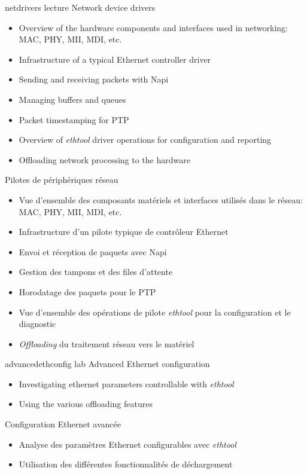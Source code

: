 {netdrivers}
{lecture}
{Network device drivers}
{
  \begin{itemize}
  \item Overview of the hardware components and interfaces used in
    networking: MAC, PHY, MII, MDI, etc.
  \item Infrastructure of a typical Ethernet controller driver
  \item Sending and receiving packets with Napi
  \item Managing buffers and queues
  \item Packet timestamping for PTP
  \item Overview of {\em ethtool} driver operations for configuration
    and reporting
  \item Offloading network processing to the hardware
  \end{itemize}
}
{Pilotes de périphériques réseau}
{
  \begin{itemize}
  \item Vue d'ensemble des composants matériels et interfaces utilisés
    dans le réseau: MAC, PHY, MII, MDI, etc.
  \item Infrastructure d’un pilote typique de contrôleur Ethernet
  \item Envoi et réception de paquets avec Napi
  \item Gestion des tampons et des files d’attente
  \item Horodatage des paquets pour le PTP
  \item Vue d'ensemble des opérations de pilote {\em ethtool} pour la
    configuration et le diagnostic
  \item {\em Offloading} du traitement réseau vers le matériel
  \end{itemize}
}

{advancedethconfig}
{lab}
{Advanced Ethernet configuration}
{
  \begin{itemize}
  \item Investigating ethernet parameters controllable with {\em
    ethtool}
  \item Using the various offloading features
  \end{itemize}
}
{Configuration Ethernet avancée}
{
  \begin{itemize}
  \item Analyse des paramètres Ethernet configurables avec {\em
    ethtool}
  \item Utilisation des différentes fonctionnalités de déchargement
  \end{itemize}
}

